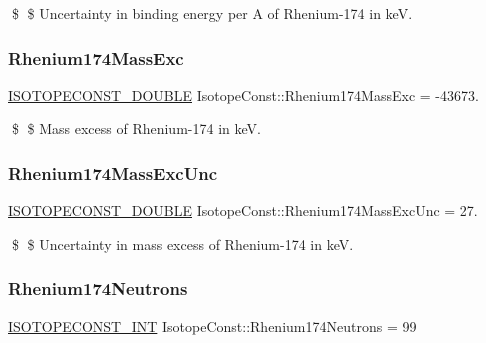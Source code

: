 \$ \$ Uncertainty in binding energy per A of Rhenium-\/174 in keV. \mbox{\label{group___isotope_const-_rhenium-_re174_ga3b20d0880d7417fc029d347d4aaef875}} 
\subsubsection{\texorpdfstring{Rhenium174\+Mass\+Exc}{Rhenium174MassExc}}
{\footnotesize\ttfamily \mbox{\hyperlink{group___isotope_const-_macros_ga8f45a7272ce02c0b4c65c44636ed719a}{I\+S\+O\+T\+O\+P\+E\+C\+O\+N\+S\+T\+\_\+\+D\+O\+U\+B\+LE}} Isotope\+Const\+::\+Rhenium174\+Mass\+Exc = -\/43673.}

\$ \$ Mass excess of Rhenium-\/174 in keV. \mbox{\label{group___isotope_const-_rhenium-_re174_ga45299a03a4f6d448d7ade27a77bfc6f6}} 
\subsubsection{\texorpdfstring{Rhenium174\+Mass\+Exc\+Unc}{Rhenium174MassExcUnc}}
{\footnotesize\ttfamily \mbox{\hyperlink{group___isotope_const-_macros_ga8f45a7272ce02c0b4c65c44636ed719a}{I\+S\+O\+T\+O\+P\+E\+C\+O\+N\+S\+T\+\_\+\+D\+O\+U\+B\+LE}} Isotope\+Const\+::\+Rhenium174\+Mass\+Exc\+Unc = 27.}

\$ \$ Uncertainty in mass excess of Rhenium-\/174 in keV. \mbox{\label{group___isotope_const-_rhenium-_re174_ga9cbfcdc2699806a38eff852add192634}} 
\subsubsection{\texorpdfstring{Rhenium174\+Neutrons}{Rhenium174Neutrons}}
{\footnotesize\ttfamily \mbox{\hyperlink{group___isotope_const-_macros_ga5f18360b3e99483a35c32d789e62621c}{I\+S\+O\+T\+O\+P\+E\+C\+O\+N\+S\+T\+\_\+\+I\+NT}} Isotope\+Const\+::\+Rhenium174\+Neutrons = 99}

